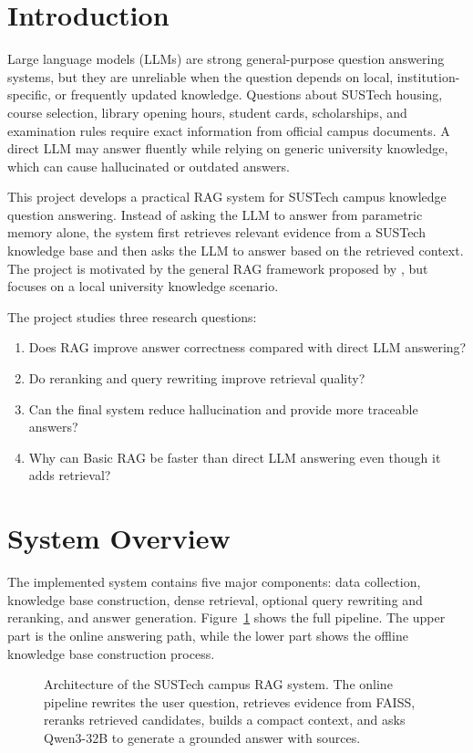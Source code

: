 \section{Introduction}

Large language models (LLMs) are strong general-purpose question answering systems, but they are unreliable when the question depends on local, institution-specific, or frequently updated knowledge. Questions about SUSTech housing, course selection, library opening hours, student cards, scholarships, and examination rules require exact information from official campus documents. A direct LLM may answer fluently while relying on generic university knowledge, which can cause hallucinated or outdated answers.

This project develops a practical RAG system for SUSTech campus knowledge question answering. Instead of asking the LLM to answer from parametric memory alone, the system first retrieves relevant evidence from a SUSTech knowledge base and then asks the LLM to answer based on the retrieved context. The project is motivated by the general RAG framework proposed by \citet{lewis2020rag}, but focuses on a local university knowledge scenario.

The project studies three research questions:
\begin{enumerate}
    \item Does RAG improve answer correctness compared with direct LLM answering?
    \item Do reranking and query rewriting improve retrieval quality?
    \item Can the final system reduce hallucination and provide more traceable answers?
    \item Why can Basic RAG be faster than direct LLM answering even though it adds retrieval?
\end{enumerate}

\section{System Overview}

The implemented system contains five major components: data collection, knowledge base construction, dense retrieval, optional query rewriting and reranking, and answer generation. Figure~\ref{fig:architecture} shows the full pipeline. The upper part is the online answering path, while the lower part shows the offline knowledge base construction process.

\begin{figure}[t]
  \centering
  \caption{Architecture of the SUSTech campus RAG system. The online pipeline rewrites the user question, retrieves evidence from FAISS, reranks retrieved candidates, builds a compact context, and asks Qwen3-32B to generate a grounded answer with sources.}
  \label{fig:architecture}
\end{figure}

